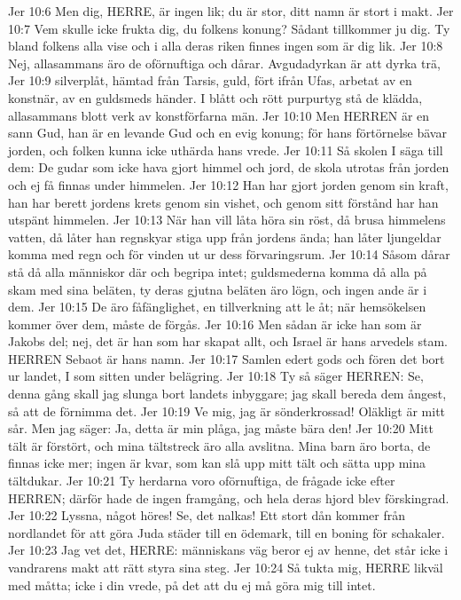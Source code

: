 Jer 10:6  Men dig, HERRE, är ingen lik; du är stor, ditt namn är stort i makt.
Jer 10:7  Vem skulle icke frukta dig, du folkens konung? Sådant tillkommer ju dig. Ty bland folkens alla vise och i alla deras riken finnes ingen som är dig lik.
Jer 10:8  Nej, allasammans äro de oförnuftiga och dårar. Avgudadyrkan är att dyrka trä,
Jer 10:9  silverplåt, hämtad från Tarsis, guld, fört ifrån Ufas, arbetat av en konstnär, av en guldsmeds händer. I blått och rött purpurtyg stå de klädda, allasammans blott verk av konstförfarna män.
Jer 10:10  Men HERREN är en sann Gud, han är en levande Gud och en evig konung; för hans förtörnelse bävar jorden, och folken kunna icke uthärda hans vrede.
Jer 10:11  Så skolen I säga till dem: De gudar som icke hava gjort himmel och jord, de skola utrotas från jorden och ej få finnas under himmelen.
Jer 10:12  Han har gjort jorden genom sin kraft, han har berett jordens krets genom sin vishet, och genom sitt förstånd har han utspänt himmelen.
Jer 10:13  När han vill låta höra sin röst, då brusa himmelens vatten, då låter han regnskyar stiga upp från jordens ända; han låter ljungeldar komma med regn och för vinden ut ur dess förvaringsrum.
Jer 10:14  Såsom dårar stå då alla människor där och begripa intet; guldsmederna komma då alla på skam med sina beläten, ty deras gjutna beläten äro lögn, och ingen ande är i dem.
Jer 10:15  De äro fåfänglighet, en tillverkning att le åt; när hemsökelsen kommer över dem, måste de förgås.
Jer 10:16  Men sådan är icke han som är Jakobs del; nej, det är han som har skapat allt, och Israel är hans arvedels stam. HERREN Sebaot är hans namn.
Jer 10:17  Samlen edert gods och fören det bort ur landet, I som sitten under belägring.
Jer 10:18  Ty så säger HERREN: Se, denna gång skall jag slunga bort landets inbyggare; jag skall bereda dem ångest, så att de förnimma det.
Jer 10:19  Ve mig, jag är sönderkrossad! Oläkligt är mitt sår. Men jag säger: Ja, detta är min plåga, jag måste bära den!
Jer 10:20  Mitt tält är förstört, och mina tältstreck äro alla avslitna. Mina barn äro borta, de finnas icke mer; ingen är kvar, som kan slå upp mitt tält och sätta upp mina tältdukar.
Jer 10:21  Ty herdarna voro oförnuftiga, de frågade icke efter HERREN; därför hade de ingen framgång, och hela deras hjord blev förskingrad.
Jer 10:22  Lyssna, något höres! Se, det nalkas! Ett stort dån kommer från nordlandet för att göra Juda städer till en ödemark, till en boning för schakaler.
Jer 10:23  Jag vet det, HERRE: människans väg beror ej av henne, det står icke i vandrarens makt att rätt styra sina steg.
Jer 10:24  Så tukta mig, HERRE likväl med måtta; icke i din vrede, på det att du ej må göra mig till intet.
